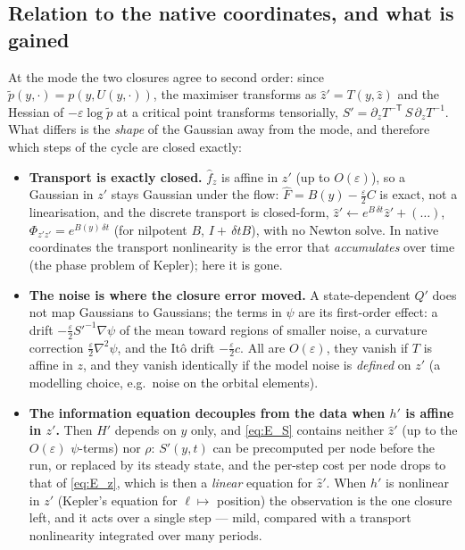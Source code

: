 \documentclass[11pt,a4paper]{article}
\newcommand{\zh}{\hat{z}}
\newcommand{\eps}{\varepsilon}
\newcommand{\dt}{\,\delta t}
\theoremstyle{plain}
\theoremstyle{definition}
\theoremstyle{remark}
\begin{document}
\subsection{Relation to the native coordinates, and what is gained}

At the mode the two closures agree to second order: since $\tilde p(y,\cdot) = p(y,U(y,\cdot))$, the maximiser transforms as $\zh' = T(y,\zh)$ and the Hessian of $-\eps\log\tilde p$ at a critical point transforms tensorially, $S' = \partial_zT^{-\mathsf T}\,S\,\partial_zT^{-1}$. What differs is the \emph{shape} of the Gaussian away from the mode, and therefore which steps of the cycle are closed exactly:
\begin{itemize}[leftmargin=1.5em]
  \item \textbf{Transport is exactly closed.} $\hat f_z$ is affine in $z'$ (up to $O(\eps)$), so a Gaussian in $z'$ stays Gaussian under the flow: $\hat F = B(y) - \tfrac\eps2C$ is exact, not a linearisation, and the discrete transport is closed-form, $\zh'\leftarrow e^{B\dt}\zh' + (\dots)$, $\Phi_{z'z'} = e^{B(y)\dt}$ (for nilpotent $B$, $I+\dt B$), with no Newton solve. In native coordinates the transport nonlinearity is the error that \emph{accumulates} over time (the phase problem of Kepler); here it is gone.
  \item \textbf{The noise is where the closure error moved.} A state-dependent $Q'$ does not map Gaussians to Gaussians; the terms in $\psi$ are its first-order effect: a drift $-\tfrac\eps2{S'}^{-1}\nabla\psi$ of the mean toward regions of smaller noise, a curvature correction $\tfrac\eps2\nabla^2\psi$, and the It\^o drift $-\tfrac\eps2c$. All are $O(\eps)$, they vanish if $T$ is affine in $z$, and they vanish identically if the model noise is \emph{defined} on $z'$ (a modelling choice, e.g.\ noise on the orbital elements).
  \item \textbf{The information equation decouples from the data when $h'$ is affine in $z'$.} Then $H'$ depends on $y$ only, and \eqref{eq:E_S} contains neither $\zh'$ (up to the $O(\eps)$ $\psi$-terms) nor $\rho$: $S'(y,t)$ can be precomputed per node before the run, or replaced by its steady state, and the per-step cost per node drops to that of \eqref{eq:E_z}, which is then a \emph{linear} equation for $\zh'$. When $h'$ is nonlinear in $z'$ (Kepler's equation for $\ell\mapsto$ position) the observation is the one closure left, and it acts over a single step --- mild, compared with a transport nonlinearity integrated over many periods.
\end{itemize}
\end{document}
